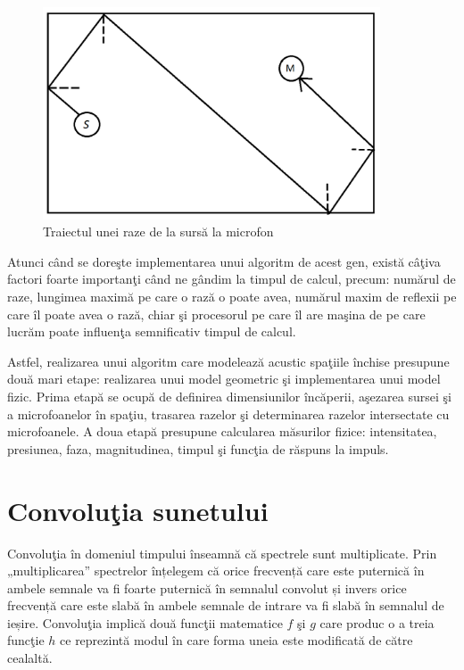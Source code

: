 	\begin{figure}[!htb]
		\centering
		\includegraphics[width=10cm]{imagini/reflectionExample.png}
		\caption{Traiectul unei raze de la surs\u{a} la microfon}
		\label{Fig11}
	\end{figure}
	
	Atunci c\^{a}nd se dore\c{s}te implementarea unui algoritm de acest gen, exist\u{a} c\^{a}\c{t}iva factori foarte importan\c{t}i c\^{a}nd ne g\^{a}ndim la timpul de calcul, precum: num\u{a}rul de raze, lungimea maxim\u{a} pe care o raz\u{a} o poate avea, num\u{a}rul maxim de reflexii pe care \^{i}l poate avea o raz\u{a}, chiar \c{s}i procesorul pe care \^{i}l are ma\c{s}ina de pe care lucr\u{a}m poate influen\c{t}a semnificativ timpul de calcul.
	\bigskip
	
	Astfel, realizarea unui algoritm care modeleaz\u{a} acustic spa\c{t}iile \^{i}nchise presupune dou\u{a} mari etape: realizarea unui model geometric \c{s}i implementarea unui model fizic. Prima etap\u{a} se ocup\u{a} de definirea dimensiunilor \^{i}nc\u{a}perii, a\c{s}ezarea sursei \c{s}i a microfoanelor \^{i}n spa\c{t}iu, trasarea razelor \c{s}i determinarea razelor intersectate cu microfoanele. A doua etap\u{a} presupune calcularea m\u{a}surilor fizice: intensitatea, presiunea, faza, magnitudinea, timpul \c{s}i func\c{t}ia de r\u{a}spuns la impuls. 
	
	\section{Convolu\c{t}ia sunetului}
	
	Convolu\c{t}ia în domeniul timpului înseamnă că spectrele sunt multiplicate. Prin „multiplicarea” spectrelor înțelegem că orice frecvență care este puternică în ambele semnale va fi foarte puternică în semnalul convolut și invers orice frecvență care este slabă în ambele semnale de intrare va fi slabă în semnalul de ieșire. Convolu\c{t}ia implic\u{a} dou\u{a} func\c{t}ii matematice $f$ \c{s}i $g$ care produc o a treia func\c{t}ie $h$ ce reprezint\u{a} modul \^{i}n care forma uneia este modificat\u{a} de c\u{a}tre cealalt\u{a}.
	\bigskip
	
